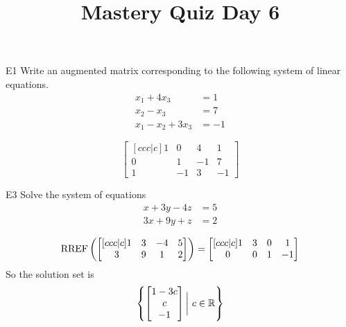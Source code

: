 \documentclass{sbgLAquiz}
\title{Mastery Quiz Day 6 }
\begin{document}
\begin{problem}{E1}
Write an augmented matrix corresponding to the following system of linear equations.
\begin{align*}
x_1+4x_3 &= 1 \\
x_2-x_3 &= 7 \\
x_1-x_2+3x_3 &= -1
\end{align*}
\end{problem}
\begin{solution}
\[
\begin{bmatrix}[ccc|c]
1 & 0 & 4 & 1 \\
0 & 1 & -1 & 7 \\
1 & -1 & 3 & -1
\end{bmatrix}
\]
\end{solution}

\begin{problem}{E3}
Solve the system of equations
\begin{align*}
x+3y-4z &= 5 \\
3x+9y+z &= 2
\end{align*}
\end{problem}
\begin{solution}
$$\operatorname{RREF} \left(\begin{bmatrix}[ccc|c] 1 & 3 & -4 & 5 \\ 3 & 9 & 1 & 2 \end{bmatrix} \right) = \begin{bmatrix}[ccc|c] 1 & 3 & 0 & 1 \\ 0 & 0 & 1 & -1\end{bmatrix}$$
So the solution set is 
$$\left\{ \begin{bmatrix} 1-3c \\ c \\ -1 \end{bmatrix} \bigg|\ c \in \mathbb{R} \right\}$$
\end{solution}
\end{document}
